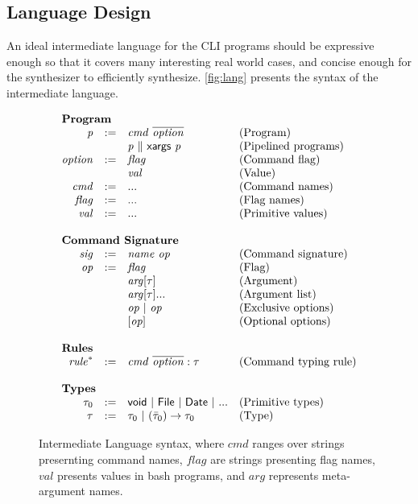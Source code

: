 \subsection{Language Design}
\label{subsec:represent}
An ideal intermediate language for the CLI programs should be expressive enough so that it covers many interesting real world cases, and concise enough for the synthesizer to efficiently synthesize. \autoref{fig:lang} presents the syntax of the intermediate language.

\begin{figure}[ht]
\[
\begin{array}{rlll}
\multicolumn{3}{l}{\textbf{Program}}\\
\mathit{p} & :=  & \mathit{cmd}~\overline{\mathit{option}} & \textrm{(Program)}\\
    &  & \mathit{p} ~\|~ \mathsf{xargs} ~\mathit{p} & \textrm{(Pipelined programs)} \\
\mathit{option} & := & \mathit{flag} & \textrm{(Command flag)}\\
                &    & \mathit{val} & \textrm{(Value)}\\
\mathit{cmd} & := & ... & \textrm{(Command names)}\\
\mathit{flag} & := & ... & \textrm{(Flag names)}\\
\mathit{val} & := & ...  & \textrm{(Primitive values)}\\
~\\
\multicolumn{3}{l}{\textbf{Command Signature}}\\
\mathit{sig} & := & \mathit{name}~\mathit{op} & \textrm{(Command signature)}\\
\mathit{op} &:= & \mathit{flag} & \textrm{(Flag)}\\
                &   & \mathit{arg}[\tau] & \textrm{(Argument)}\\
                &   & \mathit{arg}[\tau] ...& \textrm{(Argument list)}\\
                &   & \mathit{op}~|~\mathit{op} & \textrm{(Exclusive options)}\\
                &   & [ \mathit{op} ] & \textrm{(Optional options)}\\
~\\
\multicolumn{3}{l}{\textbf{Rules}}\\
\mathit{rule}^{*} &:=& \mathit{cmd}~\overline{\mathit{option}} : \tau & \textrm{(Command typing rule)}\\
~\\
\multicolumn{3}{l}{\textbf{Types}}\\
\tau_0 & := & \mathsf{void} ~|~ \mathsf{File} ~|~ \mathsf{Date} ~|~ ...& \textrm{(Primitive types)}\\
\tau & := & \tau_0 ~|~ (\bar{\tau}_0)\rightarrow \tau_0 & \textrm{(Type)}
\end{array}
\]
\caption{Intermediate Language syntax, where $\mathit{cmd}$ ranges over strings presernting command names, $\mathit{flag}$ are strings presenting flag names, $\mathit{val}$ presents values in bash programs, and $\mathit{arg}$ represents meta-argument names.}
\label{fig:lang}
\end{figure}


